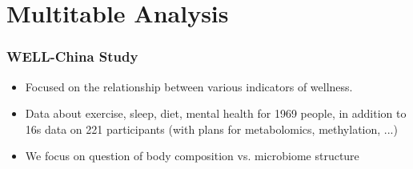 \documentclass{beamer}
\begin{document}



\section{Multitable Analysis}
\label{sec:multitable analysis}

\begin{frame}
  \frametitle{WELL-China Study}
  \begin{itemize}
  \item Focused on the relationship between various indicators of wellness.
  \item Data about exercise, sleep, diet, mental health for 1969 people, in
    addition to 16s data on 221 participants (with plans for metabolomics,
    methylation, ...)
  \item We focus on question of body composition vs. microbiome structure
  \end{itemize}
\end{frame}
\end{document}
